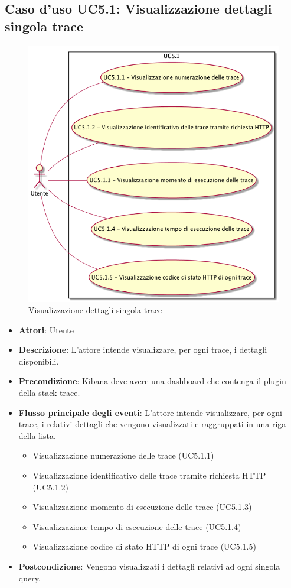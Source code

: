  \hypertarget{UC5.1}{}
\subsection{Caso d'uso UC5.1: Visualizzazione dettagli singola trace}
\begin{figure} [H]
	\centering
	\includegraphics[scale=0.45]{./UC/UC5-1.png}
	\caption{Visualizzazione dettagli singola trace}\label{}
\end{figure}
\begin{itemize}
	\item \textbf{Attori}: Utente
	\item \textbf{Descrizione}: L'attore intende visualizzare, per ogni trace, i dettagli disponibili.
	\item \textbf{Precondizione}: Kibana deve avere una dashboard che contenga il plugin della stack trace.
	\item \textbf{Flusso principale degli eventi}: L'attore intende visualizzare, per ogni trace, i relativi dettagli che vengono visualizzati e raggruppati in una riga della lista.
	\begin{itemize}
		\item Visualizzazione numerazione delle trace (UC5.1.1)
		\item Visualizzazione identificativo delle trace tramite richiesta HTTP (UC5.1.2)
		\item Visualizzazione momento di esecuzione delle trace (UC5.1.3)
		\item Visualizzazione tempo di esecuzione delle trace (UC5.1.4)
		\item Visualizzazione codice di stato HTTP di ogni trace (UC5.1.5)
	\end{itemize}
	\item \textbf{Postcondizione}: Vengono visualizzati i dettagli relativi ad ogni singola query.
\end{itemize}
